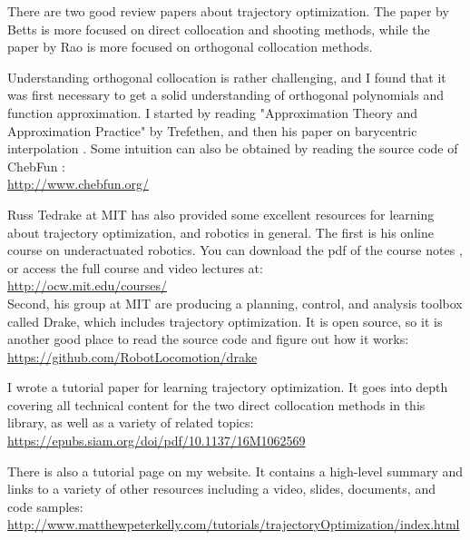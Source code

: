 \par There are two good review papers about trajectory optimization. The paper by Betts \cite{Betts1998} is more focused on direct collocation and shooting methods, while the paper by Rao \cite{Rao2009} is more focused on orthogonal collocation methods.\\

\par Understanding orthogonal collocation is rather challenging, and I found that it was first necessary to get a solid understanding of orthogonal polynomials and function approximation. I started by reading "Approximation Theory and Approximation Practice" \cite{Trefethen2012} by Trefethen, and then his paper on barycentric interpolation \cite{Berrut2004a}. Some intuition can also be obtained by reading the source code of ChebFun \cite{Driscoll2014}: \\
\url{http://www.chebfun.org/}\\

\par Russ Tedrake at MIT has also provided some excellent resources for learning about trajectory optimization, and robotics in general. The first is his online course on underactuated robotics. You can download the pdf of the course notes \cite{Tedrake2009}, or access the full course and video lectures at: \\
\href{http://ocw.mit.edu/courses/electrical-engineering-and-computer-science/6-832-underactuated-robotics-spring-2009/index.htm}{http://ocw.mit.edu/courses/} \\

Second, his group at MIT are producing a planning, control, and analysis toolbox called Drake, which includes trajectory optimization. It is open source, so it is another good place to read the source code and figure out how it works: \\
\url{https://github.com/RobotLocomotion/drake}\\

\par I wrote a tutorial paper for learning trajectory optimization. It goes into depth covering all technical content for the two direct collocation methods in this library, as well as a variety of related topics:
\url{https://epubs.siam.org/doi/pdf/10.1137/16M1062569}


\par There is also a tutorial page on my website. It contains a high-level summary and links to a variety of other resources including a video, slides, documents, and code samples: \\
\url{http://www.matthewpeterkelly.com/tutorials/trajectoryOptimization/index.html}
